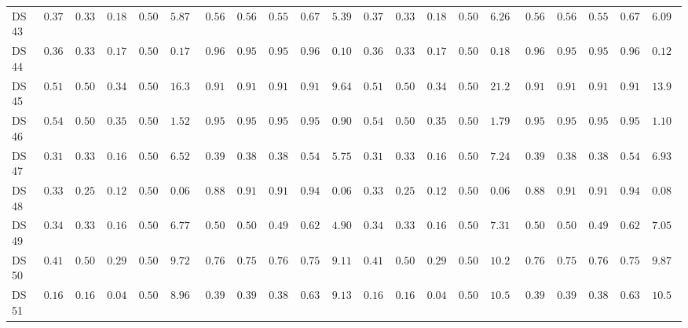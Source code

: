 {\begin{longtable}{|l|ccccc|ccccc|ccccc|ccccc|}
		DS 43 & $0.3777$ & $0.3333$ & $0.1828$ & $0.5000$ & $5.8783$ & $0.5638$ & $0.5640$ & $0.5584$ & $0.6730$ & $\boldsymbol{5.3938}$ & $0.3777$ & $0.3333$ & $0.1828$ & $0.5000$ & $6.2697$ & $0.5638$ & $0.5640$ & $0.5584$ & $0.6730$ & $6.0932$ \\
		DS 44 & $0.3667$ & $0.3333$ & $0.1789$ & $0.5000$ & $0.1753$ & $0.9667$ & $0.9524$ & $0.9599$ & $0.9643$ & $\boldsymbol{0.1096}$ & $0.3667$ & $0.3333$ & $0.1789$ & $0.5000$ & $0.1819$ & $\boldsymbol{0.9667}$ & $\boldsymbol{0.9524}$ & $\boldsymbol{0.9599}$ & $\boldsymbol{0.9643}$ & $0.1277$ \\
		DS 45 & $0.5189$ & $0.5000$ & $0.3416$ & $0.5000$ & $16.3391$ & $0.9151$ & $0.9165$ & $0.9151$ & $0.9165$ & $\boldsymbol{9.6416}$ & $0.5189$ & $0.5000$ & $0.3416$ & $0.5000$ & $21.2848$ & $0.9151$ & $0.9165$ & $0.9151$ & $0.9165$ & $13.9811$ \\
		DS 46 & $0.5444$ & $0.5000$ & $0.3525$ & $0.5000$ & $1.5212$ & $0.9556$ & $0.9592$ & $0.9555$ & $0.9592$ & $\boldsymbol{0.9083}$ & $0.5444$ & $0.5000$ & $0.3525$ & $0.5000$ & $1.7951$ & $\boldsymbol{0.9556}$ & $\boldsymbol{0.9592}$ & $\boldsymbol{0.9555}$ & $\boldsymbol{0.9592}$ & $1.1073$ \\
		DS 47 & $0.3191$ & $0.3333$ & $0.1613$ & $0.5000$ & $6.5278$ & $0.3936$ & $0.3872$ & $0.3857$ & $0.5404$ & $\boldsymbol{5.7568}$ & $0.3191$ & $0.3333$ & $0.1613$ & $0.5000$ & $7.2499$ & $0.3936$ & $0.3872$ & $0.3857$ & $0.5404$ & $6.9320$ \\
		DS 48 & $0.3333$ & $0.2500$ & $0.1250$ & $0.5000$ & $\boldsymbol{0.0633}$ & $0.8889$ & $0.9167$ & $0.9143$ & $0.9444$ & $0.0683$ & $0.3333$ & $0.2500$ & $0.1250$ & $0.5000$ & $0.0693$ & $\boldsymbol{0.8889}$ & $\boldsymbol{0.9167}$ & $\boldsymbol{0.9143}$ & $\boldsymbol{0.9444}$ & $0.0830$ \\
		DS 49 & $0.3404$ & $0.3333$ & $0.1693$ & $0.5000$ & $6.7719$ & $0.5053$ & $0.5002$ & $0.4991$ & $0.6252$ & $\boldsymbol{4.9059}$ & $0.3404$ & $0.3333$ & $0.1693$ & $0.5000$ & $7.3130$ & $\boldsymbol{0.5053}$ & $0.5002$ & $0.4991$ & $0.6252$ & $7.0537$ \\
		DS 50 & $0.4133$ & $0.5000$ & $0.2925$ & $0.5000$ & $9.7270$ & $0.7689$ & $0.7586$ & $0.7601$ & $0.7586$ & $\boldsymbol{9.1112}$ & $0.4133$ & $0.5000$ & $0.2925$ & $0.5000$ & $10.2354$ & $\boldsymbol{0.7689}$ & $\boldsymbol{0.7586}$ & $\boldsymbol{0.7601}$ & $\boldsymbol{0.7586}$ & $9.8745$ \\
		DS 51 & $0.1689$ & $0.1667$ & $0.0482$ & $0.5000$ & $\boldsymbol{8.9689}$ & $0.3956$ & $0.3943$ & $0.3837$ & $0.6366$ & $9.1372$ & $0.1689$ & $0.1667$ & $0.0482$ & $0.5000$ & $10.5603$ & $\boldsymbol{0.3956}$ & $0.3943$ & $0.3837$ & $0.6366$ & $10.5228$ \\

\end{longtable}}
